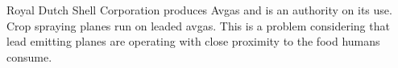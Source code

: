 \documentclass{article}\usepackage[]{graphicx}\usepackage[]{color}
\begin{document}
\bigskip


\bigskip




\bigskip





\bigskip


Royal Dutch Shell Corporation produces Avgas and is an authority on its use. Crop spraying planes run on leaded avgas. This is a problem considering that lead emitting planes are operating with close proximity to the food humans consume.


\end{document}
